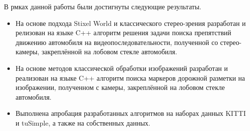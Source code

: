 \documentclass[aps,%
14pt,%
final,%
oneside,
onecolumn,%
musixtex, %
superscriptaddress,%
centertags]{extarticle} %
\begin{document}
В рмках данной работы были достигнуты следующие результаты.

\begin{itemize}
\item На основе подхода Stixel World и классического стерео-зрения разработан и релизован на языке C++ алгоритм решения задачи поиска препятствий движению автомобиля на видеопоследовательности, полученной со стерео-камеры, закреплённой на лобовом стекле автомобиля.

\item На основе методов классической обработки изображений разработан и реализован на языке C++ алгоритм поиска маркеров дорожной разметки на изображении, полученном с камеры, закреплённой на лобовом стекле автомобиля.

\item Выполнена апробация разработанных алгоритмов на наборах данных KITTI и tuSimple, а также на собственных данных.

\end{itemize}



\newpage
\end{document}
